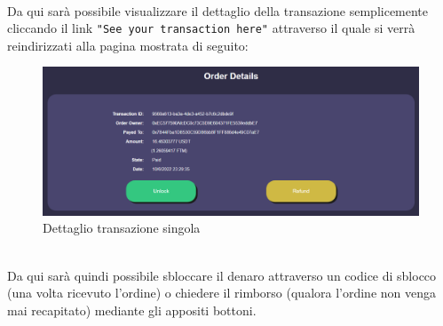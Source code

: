             \textbf{}\\
            Da qui sarà possibile visualizzare il dettaglio della transazione semplicemente cliccando il link \texttt{"See your transaction here"} attraverso il quale si verrà reindirizzati alla pagina mostrata di seguito:
            \begin{figure}[H]
                \centering
                \includegraphics[scale=0.4]{immagini/Checkout/SinglePaymentDetails.png}
                \caption{Dettaglio transazione singola}
            \end{figure}
            \textbf{}\\
            Da qui sarà quindi possibile sbloccare il denaro attraverso un codice di sblocco (una volta ricevuto l'ordine) o chiedere il rimborso (qualora l'ordine non venga mai recapitato) mediante gli appositi bottoni.
